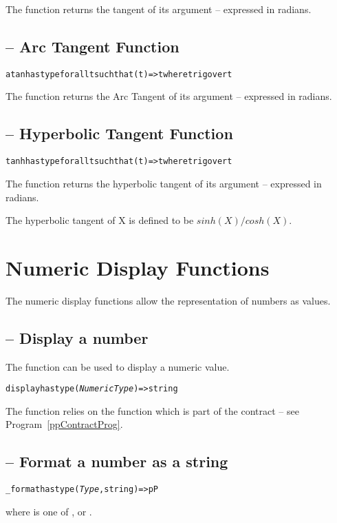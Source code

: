 The  function returns the tangent of its argument -- expressed in radians.

\subsection{ -- Arc Tangent Function}
\begin{alltt}
atan has type for all t such that (t)=>t where trig over t
\end{alltt}

The  function returns the Arc Tangent of its argument -- expressed in radians.

\subsection{ -- Hyperbolic Tangent Function}
\begin{alltt}
tanh has type for all t such that (t)=>t where trig over t
\end{alltt}

The  function returns the hyperbolic tangent of its argument -- expressed in radians.

The hyperbolic tangent of X is defined to be $sinh(X)/cosh(X)$.

\section{Numeric Display Functions}
\label{numberDisplay}

The numeric display functions allow the representation of numbers as  values.

\subsection{ -- Display a number}
\label{displayNumFun}

The  function can be used to display a numeric value.
\begin{alltt}
display has type (\emph{NumericType})=>string
\end{alltt}
The  function relies on the  function which is part of the  contract -- see Program~\vref{ppContractProg}.

\subsection{ -- Format a number as a string}
\label{formatNumber}
\begin{alltt}
\_format has type (\emph{Type},string)=>pP
\end{alltt}
where  is one of ,  or .

